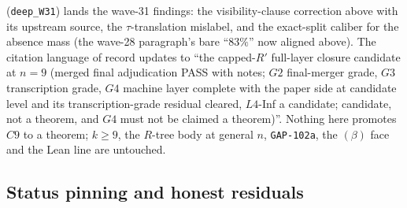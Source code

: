 (\texttt{deep\_W31}) lands the wave-31 findings: the visibility-clause
correction above with its upstream source, the $\tau$-translation
mislabel, and the exact-split caliber for the absence mass (the wave-28
paragraph's bare ``$83\%$'' now aligned above). The citation language of
record updates to ``the capped-$R'$ full-layer closure candidate at $n=9$
(merged final adjudication PASS with notes; $G2$ final-merger grade, $G3$
transcription grade, $G4$ machine layer complete with the paper side at
candidate level and its transcription-grade residual cleared, $L4$-Inf a
candidate; candidate, not a theorem, and $G4$ must not be claimed a
theorem)''. Nothing here promotes $C9$ to a theorem; $k\ge9$, the
$R$-tree body at general $n$, \texttt{GAP-102a}, the $(\beta)$ face and
the Lean line are untouched.

\subsection{Status pinning and honest residuals}\label{subsec:attackstatus}

